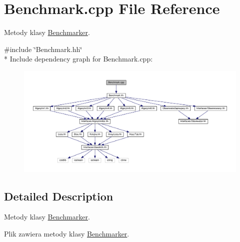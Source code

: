 \hypertarget{a00033}{}\section{Benchmark.\+cpp File Reference}
\label{a00033}


Metody klasy \hyperlink{a00009}{Benchmarker}.  


{\ttfamily \#include \char`\"{}Benchmark.\+hh\char`\"{}}\\*
Include dependency graph for Benchmark.\+cpp\+:
\nopagebreak
\begin{figure}[H]
\begin{center}
\leavevmode
\includegraphics[width=350pt]{a00076}
\end{center}
\end{figure}


\subsection{Detailed Description}
Metody klasy \hyperlink{a00009}{Benchmarker}. 

Plik zawiera metody klasy \hyperlink{a00009}{Benchmarker}. 